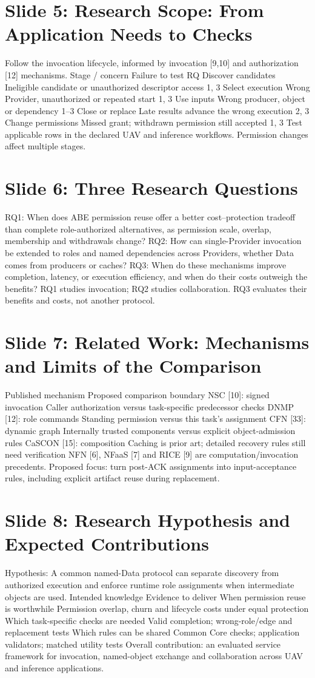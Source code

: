 \documentclass[11pt]{article}
\newcommand{\slideentry}[3]{\section*{Slide #1: #2}#3\par}
\begin{document}
\slideentry{5}{Research Scope: From Application Needs to Checks}{
Follow the invocation lifecycle, informed by invocation [9,10] and authorization [12] mechanisms. Stage / concern Failure to test RQ Discover candidates Ineligible candidate or unauthorized descriptor access 1, 3 Select execution Wrong Provider, unauthorized or repeated start 1, 3 Use inputs Wrong producer, object or dependency 1--3 Close or replace Late results advance the wrong execution 2, 3 Change permissions Missed grant; withdrawn permission still accepted 1, 3 Test applicable rows in the declared UAV and inference workflows. Permission changes affect multiple stages.
}
\slideentry{6}{Three Research Questions}{
RQ1: When does ABE permission reuse offer a better cost--protection tradeoff than complete role-authorized alternatives, as permission scale, overlap, membership and withdrawals change? RQ2: How can single-Provider invocation be extended to roles and named dependencies across Providers, whether Data comes from producers or caches? RQ3: When do these mechanisms improve completion, latency, or execution efficiency, and when do their costs outweigh the benefits? RQ1 studies invocation; RQ2 studies collaboration. RQ3 evaluates their benefits and costs, not another protocol.
}
\slideentry{7}{Related Work: Mechanisms and Limits of the Comparison}{
Published mechanism Proposed comparison boundary NSC [10]: signed invocation Caller authorization versus task-specific predecessor checks DNMP [12]: role commands Standing permission versus this task’s assignment CFN [33]: dynamic graph Internally trusted components versus explicit object-admission rules CaSCON [15]: composition Caching is prior art; detailed recovery rules still need verification NFN [6], NFaaS [7] and RICE [9] are computation/invocation precedents. Proposed focus: turn post-ACK assignments into input-acceptance rules, including explicit artifact reuse during replacement.
}
\slideentry{8}{Research Hypothesis and Expected Contributions}{
Hypothesis: A common named-Data protocol can separate discovery from authorized execution and enforce runtime role assignments when intermediate objects are used. Intended knowledge Evidence to deliver When permission reuse is worthwhile Permission overlap, churn and lifecycle costs under equal protection Which task-specific checks are needed Valid completion; wrong-role/edge and replacement tests Which rules can be shared Common Core checks; application validators; matched utility tests Overall contribution: an evaluated service framework for invocation, named-object exchange and collaboration across UAV and inference applications.
}
\end{document}
